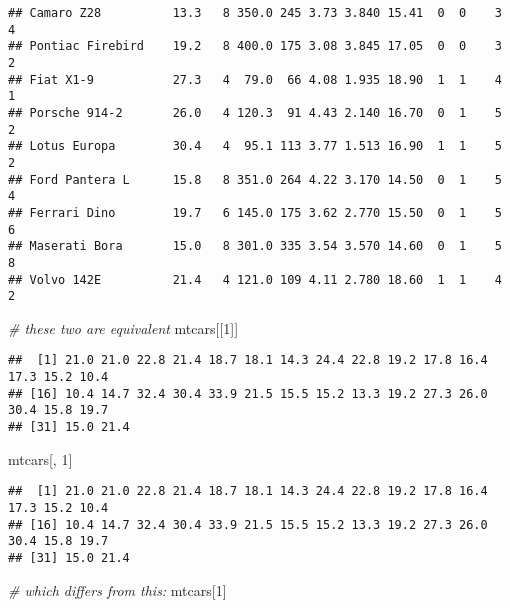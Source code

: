 \documentclass[
]{book}
\newenvironment{Shaded}{\begin{snugshade}}{\end{snugshade}}
\newcommand{\CommentTok}[1]{\textcolor[rgb]{0.56,0.35,0.01}{\textit{#1}}}
\newcommand{\DecValTok}[1]{\textcolor[rgb]{0.00,0.00,0.81}{#1}}
\newcommand{\NormalTok}[1]{#1}
\begin{document}
\begin{verbatim}
## Camaro Z28          13.3   8 350.0 245 3.73 3.840 15.41  0  0    3    4
## Pontiac Firebird    19.2   8 400.0 175 3.08 3.845 17.05  0  0    3    2
## Fiat X1-9           27.3   4  79.0  66 4.08 1.935 18.90  1  1    4    1
## Porsche 914-2       26.0   4 120.3  91 4.43 2.140 16.70  0  1    5    2
## Lotus Europa        30.4   4  95.1 113 3.77 1.513 16.90  1  1    5    2
## Ford Pantera L      15.8   8 351.0 264 4.22 3.170 14.50  0  1    5    4
## Ferrari Dino        19.7   6 145.0 175 3.62 2.770 15.50  0  1    5    6
## Maserati Bora       15.0   8 301.0 335 3.54 3.570 14.60  0  1    5    8
## Volvo 142E          21.4   4 121.0 109 4.11 2.780 18.60  1  1    4    2
\end{verbatim}

\begin{Shaded}
\begin{Highlighting}[]
\CommentTok{\# these two are equivalent}
\NormalTok{mtcars[[}\DecValTok{1}\NormalTok{]]}
\end{Highlighting}
\end{Shaded}

\begin{verbatim}
##  [1] 21.0 21.0 22.8 21.4 18.7 18.1 14.3 24.4 22.8 19.2 17.8 16.4 17.3 15.2 10.4
## [16] 10.4 14.7 32.4 30.4 33.9 21.5 15.5 15.2 13.3 19.2 27.3 26.0 30.4 15.8 19.7
## [31] 15.0 21.4
\end{verbatim}

\begin{Shaded}
\begin{Highlighting}[]
\NormalTok{mtcars[, }\DecValTok{1}\NormalTok{]}
\end{Highlighting}
\end{Shaded}

\begin{verbatim}
##  [1] 21.0 21.0 22.8 21.4 18.7 18.1 14.3 24.4 22.8 19.2 17.8 16.4 17.3 15.2 10.4
## [16] 10.4 14.7 32.4 30.4 33.9 21.5 15.5 15.2 13.3 19.2 27.3 26.0 30.4 15.8 19.7
## [31] 15.0 21.4
\end{verbatim}

\begin{Shaded}
\begin{Highlighting}[]
\CommentTok{\# which differs from this:}
\NormalTok{mtcars[}\DecValTok{1}\NormalTok{]}
\end{Highlighting}
\end{Shaded}
\end{document}
